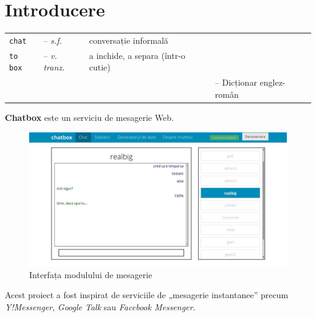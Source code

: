 \documentclass[12pt,a4paper]{article}
\begin{document}


\newpage
\section{Introducere}


\hspace{-26px}
\begin{tabular}{l l l l}
\texttt{chat} & --  \textit{s.f.} & conversație informală &\\
\texttt{to box} & --  \textit{v. tranz.} & a inchide, a separa (într-o cutie)&\\
& & & -- Dicționar englez-român\\ %
\end{tabular}

\vfill
{\large \textbf{Chatbox} este un serviciu de mesagerie Web.}

\begin{figure}[h]
	\centering
	\includegraphics[width=150mm]{img/over.jpg}
	\vspace{-15px}
	\caption{Interfața modulului de mesagerie}
	\vspace{-15px}
	\label{fig:overview}
\end{figure}

\vspace{3mm}
Acest proiect a fost inspirat de serviciile de „mesagerie instantanee”
precum \textit{Y!Messenger}, \textit{Google Talk} sau 
\textit{Facebook Messenger}.
\end{document}

